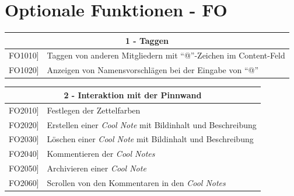 \documentclass[a4paper]{scrreprt}
\begin{document}
    		\vspace{1cm}
    		\clearpage
    		
    		\section{Optionale Funktionen - FO}
    		
    		\begin{table}[h!]
    			\centering
    			\label{my-label}
    			\begin{tabular}{p{2cm}p{12cm}}
    				
    				\multicolumn{2}{c}{\textbf{1 - Taggen}} \\ \hline
    				\centering{[}FO1010{]} & Taggen von anderen Mitgliedern mit ``@”-Zeichen im Content-Feld\\
    				\centering{[}FO1020{]}& Anzeigen von Namensvorschlägen bei der Eingabe von ``@”                               \\
    				\hline
    			\end{tabular}
    		\end{table}
    		
    		\vspace{5mm}
    		
    		\begin{table}[h!]
    			\centering
    			\label{my-label}
    			\begin{tabular}{p{2cm}p{12cm}}
    				
    				\multicolumn{2}{c}{\textbf{2 - Interaktion mit der Pinnwand}} \\ \hline
    				\centering{[}FO2010{]} & Festlegen der Zettelfarben\\
    				\centering{[}FO2020{]}& Erstellen einer \textit{Cool Note} mit Bildinhalt und Beschreibung                              \\
    				\centering{[}FO2030{]}& Löschen einer \textit{Cool Note} mit Bildinhalt und Beschreibung\\ 
    				\centering{[}FO2040{]}& Kommentieren der \textit{Cool Notes}\\ 
    				\centering{[}FO2050{]}& Archivieren einer \textit{Cool Note}\\ 
    				\centering{[}FO2060{]}& Scrollen von den Kommentaren in den \textit{Cool Notes}\\ 
    				\hline
    			\end{tabular}
    		\end{table}
    		
    		\vspace{5mm}
    		
\end{document}
